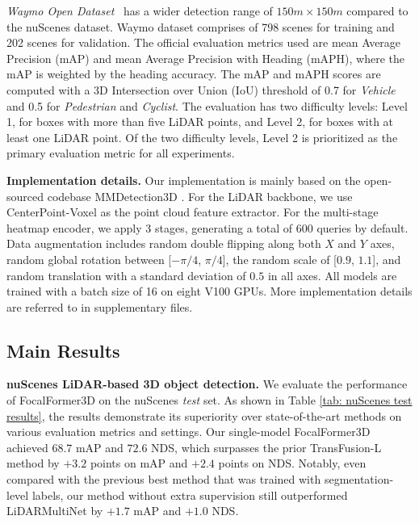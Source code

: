 \documentclass[10pt,twocolumn,letterpaper]{article}
\begin{document}
\textit{Waymo Open Dataset}~\cite{waymo} has a wider detection range of $150m\times 150m$ compared to the nuScenes dataset. Waymo dataset comprises of 798 scenes for training and 202 scenes for validation. The official evaluation metrics used are mean Average Precision (mAP) and mean Average Precision with Heading (mAPH), where the mAP is weighted by the heading accuracy. The mAP and mAPH scores are computed with a 3D Intersection over Union (IoU) threshold of 0.7 for \textit{Vehicle} and 0.5 for \textit{Pedestrian} and \textit{Cyclist}. The evaluation has two difficulty levels: Level 1, for boxes with more than five LiDAR points, and Level 2, for boxes with at least one LiDAR point. Of the two difficulty levels, Level 2 is prioritized as the primary evaluation metric for all experiments. 

\vspace{1mm}
\noindent\textbf{Implementation details.}
Our implementation is mainly based on the open-sourced codebase MMDetection3D \cite{mmdet3d2020}. For the LiDAR backbone, we use CenterPoint-Voxel as the point cloud feature extractor. For the multi-stage heatmap encoder, we apply 3 stages, generating a total of 600 queries by default. Data augmentation includes random double flipping along both $X$ and $Y$ axes, random global rotation between [$-\pi/4$, $\pi/4$], the random scale of [$0.9$, $1.1$], and random translation with a standard deviation of $0.5$ in all axes. All models are trained with a batch size of 16 on eight V100 GPUs. More implementation details are referred to in supplementary files.



\subsection{Main Results}
\noindent\textbf{nuScenes LiDAR-based 3D object detection.}
We evaluate the performance of FocalFormer3D on the nuScenes \textit{test} set. As shown in Table \ref{tab: nuScenes test results}, the results demonstrate its superiority over state-of-the-art methods on various evaluation metrics and settings. Our single-model FocalFormer3D achieved $68.7$ mAP and $72.6$ NDS, which surpasses the prior TransFusion-L method by $+3.2$ points on mAP and $+2.4$ points on NDS. Notably, even compared with the previous best method that was trained with segmentation-level labels, our method without extra supervision still outperformed LiDARMultiNet by $+1.7$ mAP and $+1.0$ NDS. 
\end{document}
